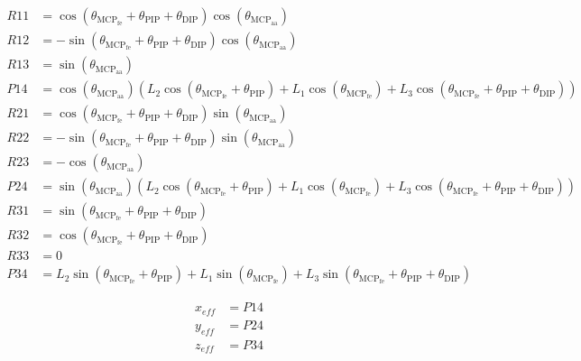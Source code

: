 \documentclass[a4paper,12pt]{article}
\begin{document}
\[
\begin{aligned}
R{11} &= \cos\left(\theta_{\mathrm{MCP_{fe}}} + \theta_{\mathrm{PIP}} + \theta_{\mathrm{DIP}}\right)\cos\left(\theta_{\mathrm{MCP_{aa}}}\right) \\
R{12} &= -\sin\left(\theta_{\mathrm{MCP_{fe}}} + \theta_{\mathrm{PIP}} + \theta_{\mathrm{DIP}}\right)\cos\left(\theta_{\mathrm{MCP_{aa}}}\right) \\
R{13} &= \sin\left(\theta_{\mathrm{MCP_{aa}}}\right) \\
P{14} &= \cos\left(\theta_{\mathrm{MCP_{aa}}}\right)\left(L_{2}\cos\left(\theta_{\mathrm{MCP_{fe}}} + \theta_{\mathrm{PIP}}\right) + L_{1}\cos\left(\theta_{\mathrm{MCP_{fe}}}\right) + L_{3}\cos\left(\theta_{\mathrm{MCP_{fe}}} + \theta_{\mathrm{PIP}} + \theta_{\mathrm{DIP}}\right)\right) \\
R{21} &= \cos\left(\theta_{\mathrm{MCP_{fe}}} + \theta_{\mathrm{PIP}} + \theta_{\mathrm{DIP}}\right)\sin\left(\theta_{\mathrm{MCP_{aa}}}\right) \\
R{22} &= -\sin\left(\theta_{\mathrm{MCP_{fe}}} + \theta_{\mathrm{PIP}} + \theta_{\mathrm{DIP}}\right)\sin\left(\theta_{\mathrm{MCP_{aa}}}\right) \\
R{23} &= -\cos\left(\theta_{\mathrm{MCP_{aa}}}\right) \\
P{24} &= \sin\left(\theta_{\mathrm{MCP_{aa}}}\right)\left(L_{2}\cos\left(\theta_{\mathrm{MCP_{fe}}} + \theta_{\mathrm{PIP}}\right) + L_{1}\cos\left(\theta_{\mathrm{MCP_{fe}}}\right) + L_{3}\cos\left(\theta_{\mathrm{MCP_{fe}}} + \theta_{\mathrm{PIP}} + \theta_{\mathrm{DIP}}\right)\right) \\
R{31} &= \sin\left(\theta_{\mathrm{MCP_{fe}}} + \theta_{\mathrm{PIP}} + \theta_{\mathrm{DIP}}\right) \\
R{32} &= \cos\left(\theta_{\mathrm{MCP_{fe}}} + \theta_{\mathrm{PIP}} + \theta_{\mathrm{DIP}}\right) \\
R{33} &= 0 \\
P{34} &= L_{2}\sin\left(\theta_{\mathrm{MCP_{fe}}} + \theta_{\mathrm{PIP}}\right) + L_{1}\sin\left(\theta_{\mathrm{MCP_{fe}}}\right) + L_{3}\sin\left(\theta_{\mathrm{MCP_{fe}}} + \theta_{\mathrm{PIP}} + \theta_{\mathrm{DIP}}\right)
\end{aligned}
\]

\begin{equation}
\label{eq:forward_kinematics}
\begin{aligned}
    x_{eff} & = P{14}\\
    y_{eff} & = P{24}\\
    z_{eff} & = P{34}
\end{aligned}
\end{equation}
\end{document}
